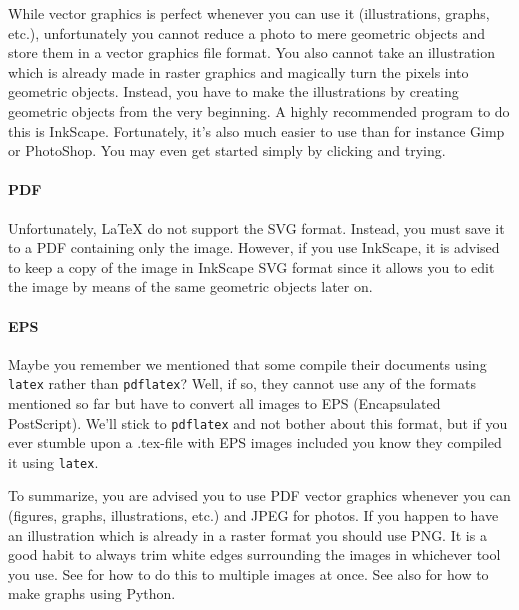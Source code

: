 {
While vector graphics is perfect whenever you can use it (illustrations, graphs, etc.), unfortunately you cannot reduce a photo to mere geometric objects and store them in a vector graphics file format. You also cannot take an illustration which is already made in raster graphics and magically turn the pixels into geometric objects. Instead, you have to make the illustrations by creating geometric objects from the very beginning. A highly recommended program to do this is InkScape. Fortunately, it's also much easier to use than for instance Gimp or PhotoShop. You may even get started simply by clicking and trying.

\paragraph{PDF} Unfortunately, \LaTeX{} do not support the SVG format. Instead, you must save it to a PDF containing only the image. However, if you use InkScape, it is advised to keep a copy of the image in InkScape SVG format since it allows you to edit the image by means of the same geometric objects later on. 

\paragraph{EPS} Maybe you remember we mentioned that some compile their documents using \verb|latex| rather than \verb|pdflatex|? Well, if so, they cannot use any of the formats mentioned so far but have to convert all images to EPS (Encapsulated PostScript). We'll stick to \verb|pdflatex| and not bother about this format, but if you ever stumble upon a .tex-file with EPS images included you know they compiled it using \verb|latex|.

To summarize, you are advised you to use PDF vector graphics whenever you can (figures, graphs, illustrations, etc.) and JPEG for photos. If you happen to have an illustration which is already in a raster format you should use PNG. It is a good habit to always trim white edges surrounding the images in whichever tool you use. See  for how to do this to multiple images at once. See also  for how to make graphs using Python.

}
